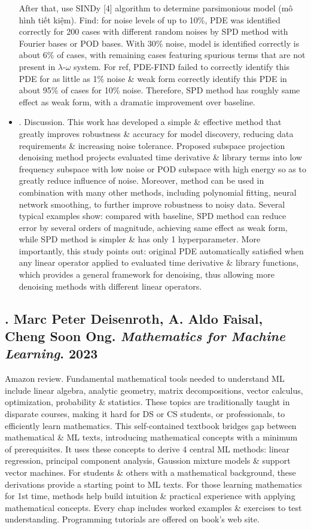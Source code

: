\documentclass{article}
\begin{document}
\begin{itemize}
	After that, use SINDy [4] algorithm to determine parsimonious model (mô hình tiết kiệm). Find: for noise levels of up to 10\%, PDE was identified correctly for 200 cases with different random noises by SPD method with Fourier bases or POD bases. With 30\% noise, model is identified correctly is about 6\% of cases, with remaining cases featuring spurious terms that are not present in $\lambda$-$\omega$ system. For ref, PDE-FIND failed to correctly identify this PDE for as little as 1\% noise \& weak form correctly identify this PDE in about 95\% of cases for 10\% noise. Therefore, SPD method has roughly same effect as weak form, with a dramatic improvement over baseline.
	\item {. Discussion.} This work has developed a simple \& effective method that greatly improves robustness \& accuracy for model discovery, reducing data requirements \& increasing noise tolerance. Proposed subspace projection denoising method projects evaluated time derivative \& library terms into low frequency subspace with low noise or POD subspace with high energy so as to greatly reduce influence of noise. Moreover, method can be used in combination with many other methods, including polynomial fitting, neural network smoothing, to further improve robustness to noisy data. Several typical examples show: compared with baseline, SPD method can reduce error by several orders of magnitude, achieving same effect as weak form, while SPD method is simpler \& has only 1 hyperparameter. More importantly, this study points out: original PDE automatically satisfied when any linear operator applied to evaluated time derivative \& library functions, which provides a general framework for denoising, thus allowing more denoising methods with different linear operators.
\end{itemize}

\subsection{\cite{Deisenroth_Faisal_Ong2023}. {\sc Marc Peter Deisenroth, A. Aldo Faisal, Cheng Soon Ong}. {\it Mathematics for Machine Learning}. 2023}
{}

{\sf Amazon review.} Fundamental mathematical tools needed to understand ML include linear algebra, analytic geometry, matrix decompositions, vector calculus, optimization, probability \& statistics. These topics are traditionally taught in disparate courses, making it hard for DS or CS students, or professionals, to efficiently learn mathematics. This self-contained textbook bridges gap between mathematical \& ML texts, introducing mathematical concepts with a minimum of prerequisites. It uses these concepts to derive 4 central ML methods: linear regression, principal component analysis, Gaussion mixture models \& support vector machines. For students \& others with a mathematical background, these derivations provide a starting point to ML texts. For those learning mathematics for 1st time, methods help build intuition \& practical experience with applying mathematical concepts. Every chap includes worked examples \& exercises to test understanding. Programming tutorials are offered on book's web site.
\end{document}
